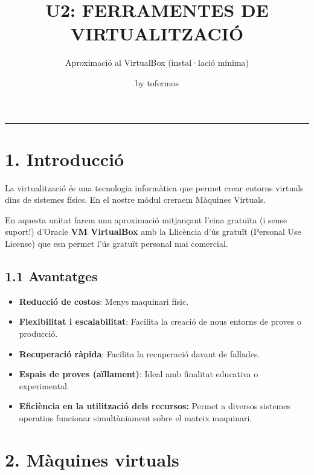 \documentclass[
  12 pt,
  a4paper,
]{article}
\title{U2: FERRAMENTES DE VIRTUALITZACIÓ}
\subtitle{Aproximació al VirtualBox (instal·lació mínima)}
\author{by tofermos}
\date{}
\providecommand{\tightlist}{%
  \setlength{\itemsep}{0pt}\setlength{\parskip}{0pt}}
\begin{document}
\maketitle

{
\setcounter{tocdepth}{2}
\tableofcontents
}
\newpage
\renewcommand\tablename{Tabla}

\begin{center}\rule{0.5\linewidth}{0.5pt}\end{center}

\section{1. Introducció}\label{introducciuxf3}

La virtualització és una tecnologia informàtica que permet crear entorns
virtuals dins de sistemes físics. En el nostre módul creraem Màquines
Virtuals.

En aquesta unitat farem una aproximació mitjançant l'eina gratuïta (i
sense suport!) d'Oracle \textbf{VM VirtualBox} amb la Llicència d'ús
gratuït (Personal Use License) que esn permet l'ús gratuït personal mai
comercial.

\subsection{1.1 Avantatges}\label{avantatges}

\begin{itemize}
\tightlist
\item
  \textbf{Reducció de costos}: Menys maquinari físic.
\item
  \textbf{Flexibilitat i escalabilitat}: Facilita la creació de nous
  entorns de proves o producció.
\item
  \textbf{Recuperació ràpida}: Facilita la recuperació davant de
  fallades.
\item
  \textbf{Espais de proves (aïllament)}: Ideal amb finalitat educativa o
  experimental.
\item
  \textbf{Eficiència en la utilització dels recursos:} Permet a diversos
  sistemes operatius funcionar simultàniament sobre el mateix maquinari.
\end{itemize}

\section{2. Màquines virtuals}\label{muxe0quines-virtuals}
\end{document}
